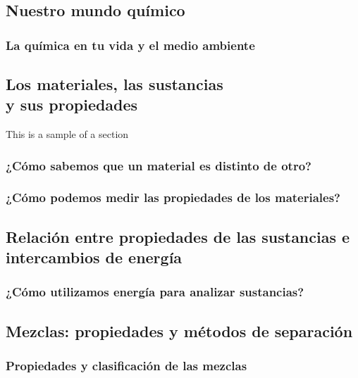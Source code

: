 \documentclass[11pt]{book}
\begin{document}
\pagestyle{empty}

\restoregeometry
{}
\tableofcontents
\newpage
\chapter{}
\pagestyle{fancy}
\newpage
\newpage \thispagestyle{plain}
\section{Nuestro mundo químico}
\subsection{La química en tu vida y el medio ambiente }

\newpage \thispagestyle{plain}
\section{Los materiales, las sustancias\\ y sus propiedades}
This is a sample of a section
\subsection{¿Cómo sabemos que un material es distinto de otro?}
\subsection{¿Cómo podemos medir las propiedades de los materiales?}
\newpage \thispagestyle{plain}
\section{Relación entre propiedades de las sustancias e intercambios de energía}
\subsection{¿Cómo utilizamos energía para analizar sustancias?}

\newpage \thispagestyle{plain}
\section{Mezclas: propiedades y métodos de separación}

\subsection{Propiedades y clasificación de las mezclas}
\end{document}
